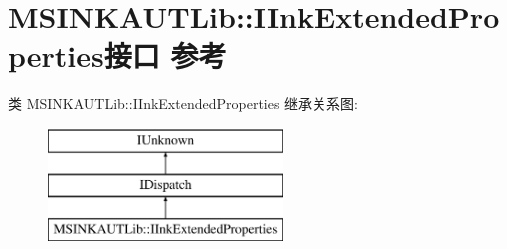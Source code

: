 \hypertarget{interface_m_s_i_n_k_a_u_t_lib_1_1_i_ink_extended_properties}{}\section{M\+S\+I\+N\+K\+A\+U\+T\+Lib\+:\+:I\+Ink\+Extended\+Properties接口 参考}
\label{interface_m_s_i_n_k_a_u_t_lib_1_1_i_ink_extended_properties}
类 M\+S\+I\+N\+K\+A\+U\+T\+Lib\+:\+:I\+Ink\+Extended\+Properties 继承关系图\+:\begin{figure}[H]
\begin{center}
\leavevmode
\includegraphics[height=3.000000cm]{interface_m_s_i_n_k_a_u_t_lib_1_1_i_ink_extended_properties}
\end{center}
\end{figure}
